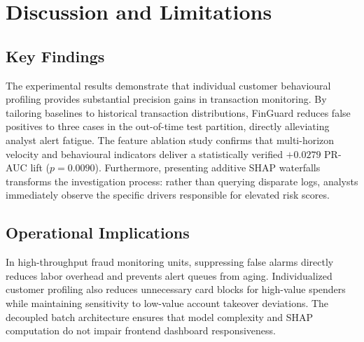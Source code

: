 \documentclass[conference]{IEEEtran}
\begin{document}
\section{Discussion and Limitations}

\subsection{Key Findings}
The experimental results demonstrate that individual customer behavioural profiling provides substantial precision gains in transaction monitoring. By tailoring baselines to historical transaction distributions, FinGuard reduces false positives to three cases in the out-of-time test partition, directly alleviating analyst alert fatigue. The feature ablation study confirms that multi-horizon velocity and behavioural indicators deliver a statistically verified $+0.0279$ PR-AUC lift ($p = 0.0090$). Furthermore, presenting additive SHAP waterfalls transforms the investigation process: rather than querying disparate logs, analysts immediately observe the specific drivers responsible for elevated risk scores.

\subsection{Operational Implications}
In high-throughput fraud monitoring units, suppressing false alarms directly reduces labor overhead and prevents alert queues from aging. Individualized customer profiling also reduces unnecessary card blocks for high-value spenders while maintaining sensitivity to low-value account takeover deviations. The decoupled batch architecture ensures that model complexity and SHAP computation do not impair frontend dashboard responsiveness.
\end{document}
